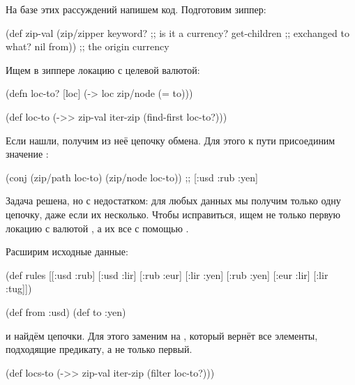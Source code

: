 На базе этих рассуждений напишем код. Подготовим зиппер:

\begin{english}
  \begin{clojure}
(def zip-val
  (zip/zipper keyword?      ;; is it a currency?
              get-children  ;; exchanged to what?
              nil
              from))        ;; the origin currency
  \end{clojure}
\end{english}

Ищем в зиппере локацию с целевой валютой:

\begin{english}
  \begin{clojure}
(defn loc-to? [loc]
  (-> loc zip/node (= to)))

(def loc-to
  (->> zip-val
       iter-zip
       (find-first loc-to?)))
  \end{clojure}
\end{english}

Если нашли, получим из неё цепочку обмена. Для этого к пути присоединим значение
:

\begin{english}
  \begin{clojure}
(conj (zip/path loc-to) (zip/node loc-to))
;; [:usd :rub :yen]
  \end{clojure}
\end{english}

Задача решена, но с недостатком: для любых данных мы получим только одну
цепочку, даже если их несколько. Чтобы исправиться, ищем не только первую
локацию с валютой , а их все с помощью .

Расширим исходные данные:

\begin{english}
  \begin{clojure}
(def rules
  [[:usd :rub]
   [:usd :lir]
   [:rub :eur]
   [:lir :yen]
   [:rub :yen]
   [:eur :lir]
   [:lir :tug]])

(def from :usd)
(def to :yen)
  \end{clojure}
\end{english}

и найдём цепочки. Для этого заменим  на , который вернёт все
элементы, подходящие предикату, а не только первый.

\begin{english}
  \begin{clojure}
(def locs-to
  (->> zip-val
       iter-zip
       (filter loc-to?)))
  \end{clojure}
\end{english}

